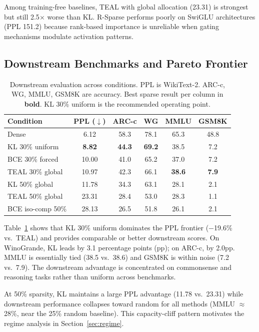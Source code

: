 \documentclass[11pt,a4paper]{article}
\begin{document}
Among training-free baselines, TEAL with global allocation (23.31) is strongest but still 2.5$\times$ worse than KL. R-Sparse performs poorly on SwiGLU architectures (PPL 151.2) because rank-based importance is unreliable when gating mechanisms modulate activation patterns.

\subsection{Downstream Benchmarks and Pareto Frontier}

\begin{table}[t]
\centering
\caption{Downstream evaluation across conditions. PPL is WikiText-2. ARC-c, WG, MMLU, GSM8K are accuracy. Best sparse result per column in \textbf{bold}. KL 30\% uniform is the recommended operating point.}
\label{tab:downstream}
\small
\begin{tabular}{lccccc}
\toprule
\textbf{Condition} & \textbf{PPL} ($\downarrow$) & \textbf{ARC-c} & \textbf{WG} & \textbf{MMLU} & \textbf{GSM8K} \\
\midrule
Dense & 6.12 & 58.3 & 78.1 & 65.3 & 48.8 \\
\midrule
KL 30\% uniform & \textbf{8.82} & \textbf{44.3} & \textbf{69.2} & 38.5 & 7.2 \\
BCE 30\% forced & 10.00 & 41.0 & 65.2 & 37.0 & 7.2 \\
TEAL 30\% global & 10.97 & 42.3 & 66.1 & \textbf{38.6} & \textbf{7.9} \\
\midrule
KL 50\% global & 11.78 & 34.3 & 63.1 & 28.1 & 2.1 \\
TEAL 50\% global & 23.31 & 28.4 & 53.0 & 28.3 & 1.1 \\
BCE iso-comp 50\% & 28.13 & 26.5 & 51.8 & 26.1 & 2.1 \\
\bottomrule
\end{tabular}
\end{table}

Table~\ref{tab:downstream} shows that KL 30\% uniform dominates the PPL frontier ($-$19.6\% vs.\ TEAL) and provides comparable or better downstream scores. On WinoGrande, KL leads by 3.1 percentage points (pp); on ARC-c, by 2.0pp. MMLU is essentially tied (38.5 vs.\ 38.6) and GSM8K is within noise (7.2 vs.\ 7.9). The downstream advantage is concentrated on commonsense and reasoning tasks rather than uniform across benchmarks.

At 50\% sparsity, KL maintains a large PPL advantage (11.78 vs.\ 23.31) while downstream performance collapses toward random for all methods (MMLU ${\approx}$28\%, near the 25\% random baseline). This capacity-cliff pattern motivates the regime analysis in Section~\ref{sec:regime}.
\end{document}
